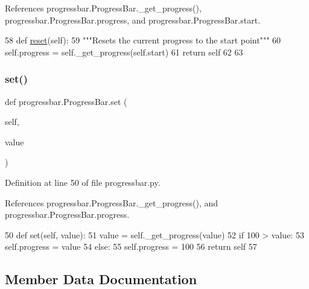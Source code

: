 References progressbar.\+Progress\+Bar.\+\_\+get\+\_\+progress(), progressbar.\+Progress\+Bar.\+progress, and progressbar.\+Progress\+Bar.\+start.


\begin{DoxyCode}
58     \textcolor{keyword}{def }\hyperlink{namespaceshell_a2f31bbe4baf894f4863c4d392239ab8b}{reset}(self):
59         \textcolor{stringliteral}{"""Resets the current progress to the start point"""}
60         self.progress = self.\_get\_progress(self.start)
61         \textcolor{keywordflow}{return} self
62 
63 
\end{DoxyCode}
\mbox{\label{classprogressbar_1_1ProgressBar_a0794442f190ed0d6e5b894f29881758b}} 
\subsubsection{\texorpdfstring{set()}{set()}}
{\footnotesize\ttfamily def progressbar.\+Progress\+Bar.\+set (\begin{DoxyParamCaption}\item[{}]{self,  }\item[{}]{value }\end{DoxyParamCaption})}



Definition at line 50 of file progressbar.\+py.



References progressbar.\+Progress\+Bar.\+\_\+get\+\_\+progress(), and progressbar.\+Progress\+Bar.\+progress.


\begin{DoxyCode}
50     \textcolor{keyword}{def }set(self, value):
51         value = self.\_get\_progress(value)
52         \textcolor{keywordflow}{if} 100 > value:
53             self.progress = value 
54         \textcolor{keywordflow}{else}:
55             self.progress = 100
56         \textcolor{keywordflow}{return} self
57 
\end{DoxyCode}


\subsection{Member Data Documentation}
\mbox{\label{classprogressbar_1_1ProgressBar_a53eaadf85baa406c1f179fea7029d8b0}} 
